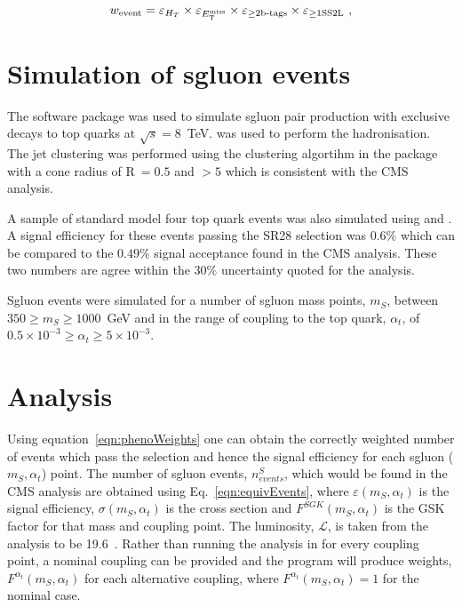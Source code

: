 \begin{equation} \label{eqn:phenoWeights}
  w_{\rm event} = \varepsilon_{H_T} \times  \varepsilon_{E_{\mathrm{T}}^{\text{miss}}} \times
    \varepsilon_{\geq\text{2b-tags}} \times \varepsilon_{\geq1 \text{SS2L}} \ ,
\end{equation}

\section{Simulation of sgluon events}
The \MGfive software package was used to simulate sgluon pair production with exclusive decays to top quarks at $\sqrt{s}=8$~TeV. \PYTHIAsix was used to perform the hadronisation. The jet clustering was performed using the \antikt clustering algortihm in the \FASTJET package with a cone radius of R$~=0.5$ and \pt$>5$ which is consistent with the CMS analysis.

A sample of standard model four top quark events was also simulated using \MGfive and \PYTHIAsix. A signal efficiency for these events passing the SR28 selection was $0.6\%$ which can be compared to the $0.49\%$ signal acceptance found in the CMS analysis. These two numbers are agree within the $30\%$ uncertainty quoted for the analysis.

Sgluon events were simulated for a number of sgluon mass points, $m_{S}$, between $350 \geq m_{S} \geq 1000$~GeV and in the range of coupling to the top quark, $\alpha_{t}$, of $0.5 \times 10^{-3}\geq \alpha_{t} \geq 5 \times 10^{-3}$.

\section{Analysis}

Using equation~\ref{eqn:phenoWeights} one can obtain the correctly weighted number of events which pass the selection and hence the signal efficiency for each sgluon ($m_{S},\alpha_{t}$) point. The number of sgluon events, $n^{S}_{events}$, which would be found in the CMS analysis are obtained using Eq.~\ref{eqn:equivEvents}, where $\varepsilon\left(m_{S},\alpha_{t}\right)$ is the signal efficiency, $\sigma\left(m_{S},\alpha_{t}\right)$ is the cross section and $F^{SGK}\left(m_{S},\alpha_{t}\right)$ is the GSK factor for that mass and coupling point. The luminosity, $\mathcal{L}$, is taken from the analysis to be 19.6~\fbinv. Rather than running the analysis in \MADAN for every coupling point, a nominal coupling can be provided and the program will produce weights, $F^{\alpha_{t}}\left(m_{S},\alpha_{t}\right)$ for each alternative coupling, where $F^{\alpha_{t}}\left(m_{S},\alpha_{t}\right) = 1$ for the nominal case.

